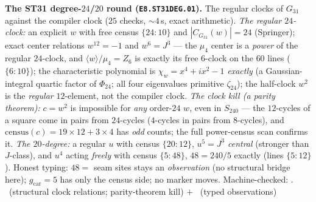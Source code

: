 \documentclass[11pt,a4paper]{article}
\newcommand{\gcar}{g_{\mathrm{car}}}
\theoremstyle{definition}
\begin{document}
\par\smallskip\noindent\textbf{The ST31 degree-$24$/$20$ round
(\texttt{E8.ST31DEG.01}).}
The regular clocks of $G_{31}$ against the compiler clock ($25$
checks, ${\sim}4$\,s, exact arithmetic).  \emph{The regular
$24$-clock:} an explicit $w$ with free census $\{24{:}10\}$ and
$|C_{G_{31}}(w)|=24$ (Springer); exact center relations $w^{12}=-1$
and $w^6=J^3$ --- the $\mu_4$ center is a \emph{power} of the regular
$24$-clock, and $\langle w\rangle/\mu_4=Z_6$ is exactly its free
$6$-clock on the $60$ lines ($\{6{:}10\}$); the characteristic
polynomial is $\chi_w=x^4+ix^2-1$ \emph{exactly} (a Gaussian-integral
quartic factor of $\Phi_{24}$; all four eigenvalues primitive
$\zeta_{24}$); the half-clock $w^2$ is the \emph{regular} $12$-element,
not the compiler clock.  \emph{The clock kill (a parity theorem):}
$c=w^2$ is impossible for \emph{any} order-$24$ $w$, even in
$S_{240}$ --- the $12$-cycles of a square come in pairs from
$24$-cycles ($4$-cycles in pairs from $8$-cycles), and
$\mathrm{census}(c)=19{\times}12+3{\times}4$ has \emph{odd} counts;
the full power-census scan confirms it.  \emph{The $20$-degree:} a
regular $u$ with census $\{20{:}12\}$, $u^5=J^3$ \emph{central}
(stronger than $J$-class), and $u^4$ acting \emph{freely} with census
$\{5{:}48\}$, $48=240/5$ exactly (lines $\{5{:}12\}$).  Honest typing:
$48=$ seam sites stays an \emph{observation} (no structural bridge
here); $\gcar=5$ has only the census side; no marker moves.
Machine-checked: .
\mE\ (structural clock relations; parity-theorem kill) $+$ \mC\
(typed observations)
\par\smallskip
\end{document}
